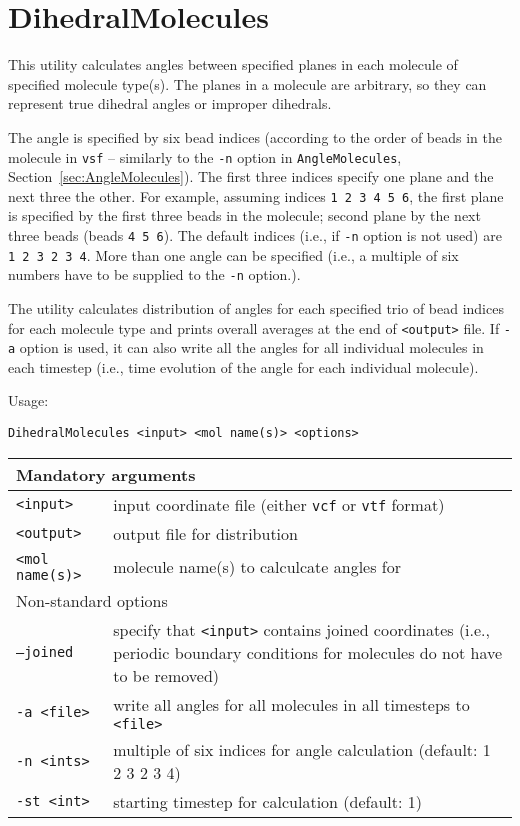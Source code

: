 \section{DihedralMolecules} \label{sec:DihedralMolecules}

This utility calculates angles between specified planes in each molecule of
specified molecule type(s). The planes in a molecule are arbitrary, so they
can represent true dihedral angles or improper dihedrals.

The angle is specified by six bead indices (according to the order of beads
in the molecule in \texttt{vsf} -- similarly to the \texttt{-n} option in
\texttt{AngleMolecules}, Section~\ref{sec:AngleMolecules}). The
first three indices specify one plane and the next three the other. For
example, assuming indices \texttt{1 2 3 4 5 6}, the first plane is
specified by the first three beads in the molecule; second plane by the
next three beads (beads \texttt{4 5 6}). The default indices
(i.e., if \texttt{-n} option is not used) are \texttt{1 2 3 2 3 4}. More
than one angle can be specified (i.e., a multiple of six numbers have to be
supplied to the \texttt{-n} option.).

The utility calculates distribution of angles for each specified trio of
bead indices for each molecule type and prints overall averages at the end
of \texttt{<output>} file. If \texttt{-a} option is used, it can also write
all the angles for all individual molecules in each timestep (i.e., time
evolution of the angle for each individual molecule).

Usage:

\vspace{1em}
\noindent
\texttt{DihedralMolecules <input> <mol name(s)> <options>}

\noindent
\begin{longtable}{p{}p{}}
  \toprule
  \multicolumn{2}{l}{Mandatory arguments} \\
  \midrule
  \texttt{<input>} & input coordinate file (either \texttt{vcf} or
    \texttt{vtf} format) \\
  \texttt{<output>} & output file for distribution \\
  \texttt{<mol name(s)>} & molecule name(s) to calculcate angles for \\
  \toprule
  \multicolumn{2}{l}{Non-standard options} \\
  \midrule
  \texttt{--joined} & specify that \texttt{<input>} contains joined
    coordinates (i.e., periodic boundary conditions for molecules do not
    have to be removed) \\
  \texttt{-a <file>} & write all angles for all molecules in all timesteps
    to \texttt{<file>} \\
  \texttt{-n  <ints>} & multiple of six indices for angle calculation
    (default: 1 2 3 2 3 4) \\
  \texttt{-st <int>} & starting timestep for calculation (default: 1) \\
  \bottomrule
\end{longtable}

